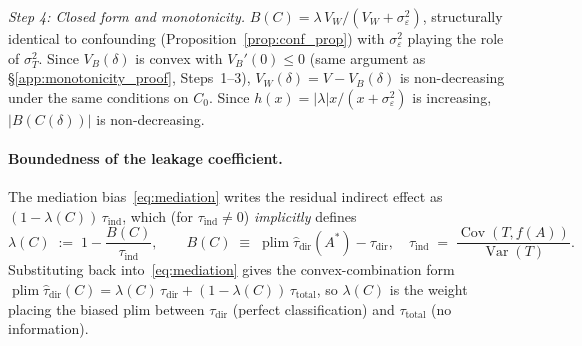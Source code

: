 \emph{Step 4: Closed form and monotonicity.}
$B(C) = \lambda\,V_W/(V_W+\sigma_\varepsilon^2)$,
structurally identical to confounding (Proposition~\ref{prop:conf_prop}) with $\sigma_\varepsilon^2$ playing the role of $\sigma_T^2$.
Since $V_B(\delta)$ is convex with $V_B'(0)\leq 0$ (same argument as \S\ref{app:monotonicity_proof}, Steps~1--3), $V_W(\delta)=V{-}V_B(\delta)$ is non-decreasing under the same conditions on $C_0$.
Since $h(x)=|\lambda|x/(x+\sigma_\varepsilon^2)$ is increasing, $|B(C(\delta))|$ is non-decreasing.

\paragraph{Boundedness of the leakage coefficient.}

The mediation bias~\eqref{eq:mediation} writes the residual indirect effect as $(1-\lambda(C))\,\tau_{\mathrm{ind}}$, which (for $\tau_{\mathrm{ind}}\neq 0$) \emph{implicitly} defines
\begin{equation}
\label{eq:lambda_def}
  \lambda(C) \;:=\; 1-\frac{B(C)}{\tau_{\mathrm{ind}}},\qquad
  B(C)\;\equiv\;\operatorname{plim}\hat{\tau}_{\mathrm{dir}}(A^*)-\tau_{\mathrm{dir}},\quad
  \tau_{\mathrm{ind}}\;=\;\frac{\operatorname{Cov}(T,f(A))}{\operatorname{Var}(T)}.
\end{equation}
Substituting back into~\eqref{eq:mediation} gives the convex-combination form
$\operatorname{plim}\hat\tau_{\mathrm{dir}}(C)=\lambda(C)\,\tau_{\mathrm{dir}}+(1-\lambda(C))\,\tau_{\mathrm{total}}$, so $\lambda(C)$ is the weight placing the biased plim between $\tau_{\mathrm{dir}}$ (perfect classification) and $\tau_{\mathrm{total}}$ (no information).

